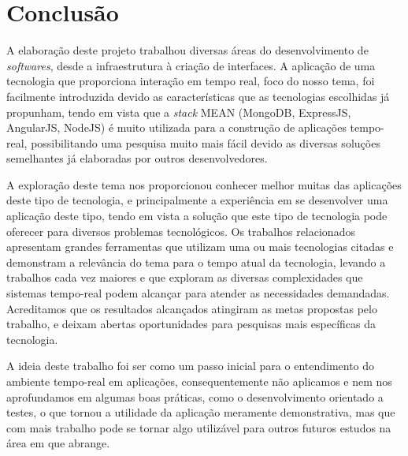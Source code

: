 \chapter{Conclusão}
A elaboração deste projeto trabalhou diversas áreas do desenvolvimento de \textit{softwares}, desde a infraestrutura à criação de interfaces. A aplicação de uma tecnologia que proporciona interação em tempo real, foco do nosso tema, foi facilmente introduzida devido as características que as tecnologias escolhidas já propunham, tendo em vista que a \textit{stack} MEAN (MongoDB, ExpressJS, AngularJS, NodeJS) é muito utilizada para a construção de aplicações tempo-real, possibilitando uma pesquisa muito mais fácil devido as diversas soluções semelhantes já elaboradas por outros desenvolvedores.

A exploração deste tema nos proporcionou conhecer melhor muitas das aplicações deste tipo de tecnologia, e principalmente a experiência em se desenvolver uma aplicação deste tipo, tendo em vista a solução que este tipo de tecnologia pode oferecer para diversos problemas tecnológicos. Os trabalhos relacionados apresentam grandes ferramentas que utilizam uma ou mais tecnologias citadas e demonstram a relevância do tema para o tempo atual da tecnologia, levando a trabalhos cada vez maiores e que exploram as diversas complexidades que sistemas tempo-real podem alcançar para atender as necessidades demandadas. Acreditamos que os resultados alcançados atingiram as metas propostas pelo trabalho, e deixam abertas oportunidades para pesquisas mais específicas da tecnologia.

A ideia deste trabalho foi ser como um passo inicial para o entendimento do ambiente tempo-real em aplicações, consequentemente não aplicamos e nem nos aprofundamos em algumas boas práticas, como o desenvolvimento orientado a testes, o que tornou a utilidade da aplicação meramente demonstrativa, mas que com mais trabalho pode se tornar algo utilizável para outros futuros estudos na área em que abrange.




